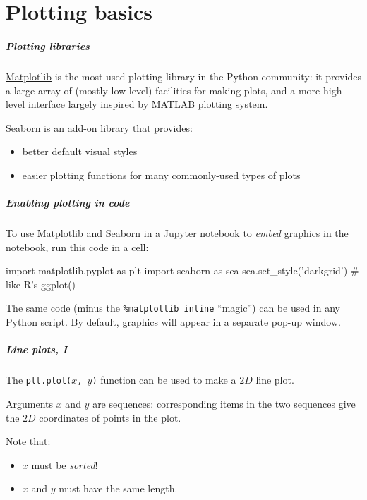 \documentclass[english,serif,mathserif,xcolor=pdftex,dvipsnames,table]{beamer}
\begin{document}
\part{Plotting basics}
\begin{frame}
  \frametitle{Plotting libraries}

  \href{http://matplotlib.org/gallery.html}{Matplotlib} is the most-used
plotting library in the Python community: it provides a large array of
(mostly low level) facilities for making plots, and a more high-level
interface largely inspired by MATLAB plotting system.

\+
\href{http://seaborn.pydata.org/index.html}{Seaborn} is an add-on
library that provides:

\begin{itemize}
\item
  better default visual styles
\item
  easier plotting functions for many commonly-used types of plots
\end{itemize}

\end{frame}

\begin{frame}[fragile]
  \frametitle{Enabling plotting in code}

  To use Matplotlib and Seaborn in a Jupyter notebook to \emph{embed} graphics
  in the notebook, run this code in a cell:
  \begin{python}

import matplotlib.pyplot as plt
import seaborn as sea
sea.set_style('darkgrid') # like R's ggplot()
  \end{python}

  \+ The same code (minus the \texttt{\%matplotlib inline} ``magic'') can be
  used in any Python script.  By default, graphics will appear in a separate
  pop-up window.
\end{frame}


\begin{frame}
  \frametitle{Line plots, I}
  The \texttt{plt.plot($x$, $y$)} function can be used to make a $2D$ line plot.

  \+
  Arguments \texttt{$x$} and \texttt{$y$} are sequences: corresponding items in
  the two sequences give the $2D$ coordinates of points in the plot.

  \+
  Note that:
  \begin{itemize}
  \item \texttt{$x$} must be \emph{sorted}!
  \item \texttt{$x$} and \texttt{$y$} must have the same length.
  \end{itemize}
\end{frame}
\end{document}
